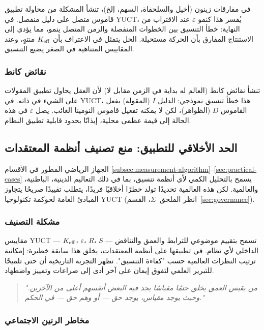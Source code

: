 \documentclass[11pt,a4paper]{article}
\newcommand{\eps}{\varepsilon}
\begin{document}
	في مفارقات زينون (أخيل والسلحفاة، السهم، إلخ)، تنشأ المشكلة من محاولة تطبيق قاموس متصل على دليل منفصل. في YUCT، يُفسر هذا كنمو \(\eps\) عند الاقتراب من النهاية: خطأ التنسيق بين الخطوات المنفصلة والزمن المتصل ينمو، مما يؤدي إلى الاستنتاج المفارق بأن الحركة مستحيلة. الحل يتمثل في الاعتراف بأن \(\Keff\) منتهٍ، وعند المقاييس المتناهية في الصغر يضيع التنسيق.
	
	\subsubsection{نقائض كانط}
	
	تنشأ نقائض كانط (العالم له بداية في الزمن مقابل لا) لأن العقل يحاول تطبيق المقولات على الشيء في ذاته. في YUCT، هذا خطأ تنسيق نموذجي: الدليل \(I\) (المقولة) يفعل القاموس \(D\) (الظواهر)، لكن لا يمكنه تفعيل قاموس النومينا الغائب. يصل \(\eps\) في هذه الحالة إلى قيمة عظمى محلية، إيذانًا بحدود قابلية تطبيق النظام.
	
	\subsection{الحد الأخلاقي للتطبيق: منع تصنيف أنظمة المعتقدات}
	\label{subsec:belief-classification}
	
	الجهاز الرياضي المطور في الأقسام \ref{subsec:measurement-algorithm}–\ref{sec:practical-cases} يسمح بالتحليل الكمي لأي أنظمة تنسيق، بما في ذلك التعاليم الدينية، الباطنية، والعالمية. لكن هذه العالمية تحديدًا تولد خطرًا أخلاقيًا فريدًا، يتطلب تقييدًا صريحًا يتجاوز المبادئ العامة لحوكمة تكنولوجيا YUCT (انظر الملحق~$\Sigma$، القسم~\ref{sec:governance}).
	
	\subsubsection{مشكلة التصنيف}
	
	مقاييس YUCT — $\Keff$، $\eps$، $R$، $S$ — تسمح بتقييم موضوعي للترابط والعمق والتناقض الداخلي لأي نظام. في تطبيقها على أنظمة المعتقدات، يخلق هذا سابقة خطيرة: إمكانية ترتيب النظرات العالمية حسب "كفاءة التنسيق". تظهر التجربة التاريخية أن حتى تلميحًا للتبرير العلمي لتفوق إيمان على آخر أدى إلى صراعات وتمييز واضطهاد.
	
	\begin{quote}
		\itshape
		"من يقيس العمق يخلق حتمًا مقياسًا يجد فيه البعض أنفسهم أعلى من الآخرين. وحيث يوجد مقياس، يوجد حق — أو وهم حق — في الحكم."
	\end{quote}
	
	\subsubsection{مخاطر الرنين الاجتماعي}
	
\end{document}
